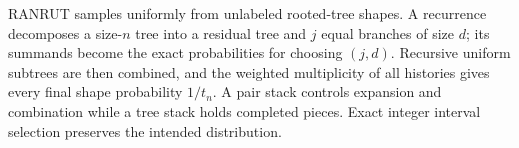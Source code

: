 \documentclass[10pt,letterpaper]{article}
\begin{document}
\begin{tcolorbox}[colback=Ink!4,colframe=Ink,title=Cornell summary]
RANRUT samples uniformly from unlabeled rooted-tree shapes. A recurrence decomposes a size-$n$ tree into a residual tree and $j$ equal branches of size $d$; its summands become the exact probabilities for choosing $(j,d)$. Recursive uniform subtrees are then combined, and the weighted multiplicity of all histories gives every final shape probability $1/t_n$. A pair stack controls expansion and combination while a tree stack holds completed pieces. Exact integer interval selection preserves the intended distribution.
\end{tcolorbox}
\end{document}
